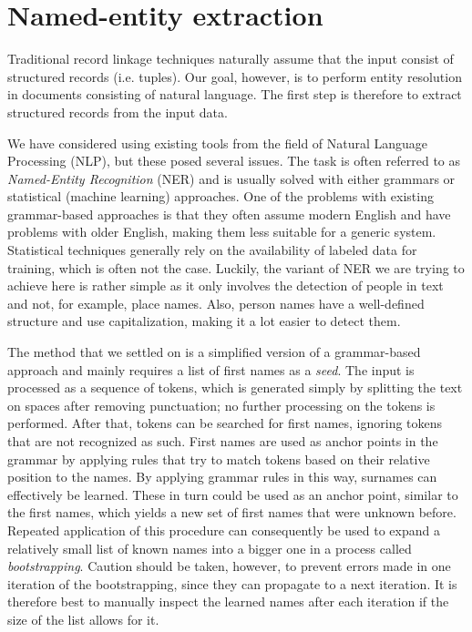 

\section{Named-entity extraction}
\label{sec:segmentation}

Traditional record linkage techniques naturally assume that the input consist of structured records (i.e. tuples).
Our goal, however, is to perform entity resolution in documents consisting of natural language.
The first step is therefore to extract structured records from the input data.

We have considered using existing tools from the field of Natural Language Processing (NLP), but these posed several issues.
The task is often referred to as \emph{Named-Entity Recognition} (NER) and is usually solved with either grammars or statistical (machine learning) approaches.
One of the problems with existing grammar-based approaches is that they often assume modern English and have problems with older English, making them less suitable for a generic system.
Statistical techniques generally rely on the availability of labeled data for training, which is often not the case.
Luckily, the variant of NER we are trying to achieve here is rather simple as it only involves the detection of people in text and not, for example, place names.
Also, person names have a well-defined structure and use capitalization, making it a lot easier to detect them.

The method that we settled on is a simplified version of a grammar-based approach and mainly requires a list of first names as a \emph{seed}.
The input is processed as a sequence of tokens, which is generated simply by splitting the text on spaces after removing punctuation; no further processing on the tokens is performed.
After that, tokens can be searched for first names, ignoring tokens that are not recognized as such.
First names are used as anchor points in the grammar by applying rules that try to match tokens based on their relative position to the names.
By applying grammar rules in this way, surnames can effectively be learned.
These in turn could be used as an anchor point, similar to the first names, which yields a new set of first names that were unknown before.
Repeated application of this procedure can consequently be used to expand a relatively small list of known names into a bigger one in a process called \emph{bootstrapping}.
Caution should be taken, however, to prevent errors made in one iteration of the bootstrapping, since they can propagate to a next iteration.
It is therefore best to manually inspect the learned names after each iteration if the size of the list allows for it.

